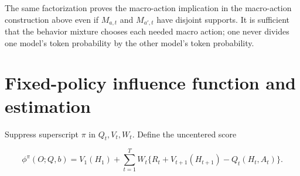 The same factorization proves the macro-action implication in the macro-action construction above even if \(M_{a,t}\) and \(M_{a',t}\) have disjoint supports. It is sufficient that the behavior mixture chooses each needed macro action; one never divides one model's token probability by the other model's token probability.

\section{Fixed-policy influence function and estimation}\label{fixed-policy-influence-function-and-estimation}

Suppress superscript \(\pi\) in \(Q_t,V_t,W_t\). Define the uncentered score

\begin{equation}\label{eq:core7}
\phi^{\pi}(O;Q,b)
=V_1(H_1)+\sum_{t=1}^{T}W_t
\{R_t+V_{t+1}(H_{t+1})-Q_t(H_t,A_t)\}.
\end{equation}

